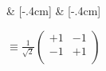 
\begin{quantikz}[row sep={0.6cm,between origins}, wire types={q}]
	 & [-.4cm]  & [-.4cm] \\
\end{quantikz} $ \equiv \frac{1}{\sqrt{2}}\begin{pmatrix}
		+1 & -1 \\
		-1 & +1 \\
	\end{pmatrix} $